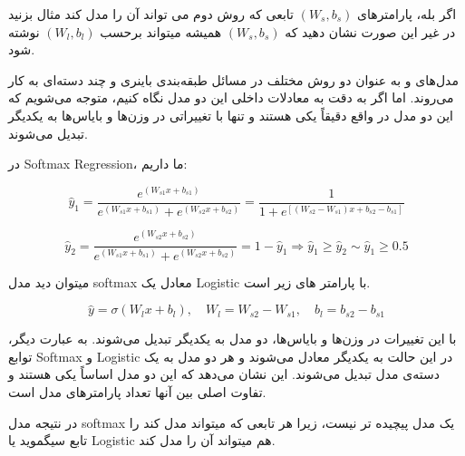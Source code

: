 \begin{enumerate}
{	      اگر بله، پارامترهای  $(W_s, b_s)$ تابعی که روش دوم می تواند آن را مدل کند مثال بزنید در غیر این صورت
	      نشان دهید که $(W_s, b_s)$ همیشه میتواند برحسب $(W_l, b_l)$ نوشته شود.

	      \begin{qsolve}[]
		      مدل‌های  و  به عنوان دو روش مختلف در مسائل طبقه‌بندی باینری و چند دسته‌ای به کار می‌روند. اما اگر به دقت به معادلات داخلی این دو مدل نگاه کنیم، متوجه می‌شویم که این دو مدل در واقع دقیقاً یکی هستند و تنها با تغییراتی در وزن‌ها و بایاس‌ها به یکدیگر تبدیل می‌شوند.

		      در Softmax Regression، ما داریم:

		      \[
			      \hat{y}_1 = \frac{e^{(W_{s1}x + b_{s1})}}{e^{(W_{s1}x + b_{s1})} + e^{(W_{s2}x + b_{s2})}}=\frac{1}{1 + e^{[(W_{s2}-W_{s1})x + b_{s2}-b_{s1}]}}
		      \]

		      \[
			      \hat{y}_2 = \frac{e^{(W_{s2}x + b_{s2})}}{e^{(W_{s1}x + b_{s1})} + e^{(W_{s2}x + b_{s2})}}=1-\hat{y}_1\Rightarrow \hat{y}_1\geq\hat{y}_2\sim\hat{y}_1\geq0.5
		      \]

		      میتوان دید مدل softmax معادل یک Logistic با پارامتر های زیر است.

		      \[
			      \hat{y} = \sigma(W_lx + b_l),\quad W_l = W_{s2}-W_{s1},\quad b_l=b_{s2}-b_{s1}
		      \]

		      با این تغییرات در وزن‌ها و بایاس‌ها، دو مدل به یکدیگر تبدیل می‌شوند. به عبارت دیگر، توابع Softmax و Logistic در این حالت به یکدیگر معادل می‌شوند و هر دو مدل به یک دسته‌ی مدل تبدیل می‌شوند. این نشان می‌دهد که این دو مدل اساساً یکی هستند و تفاوت اصلی بین آنها تعداد پارامترهای مدل است.

              در نتیجه مدل softmax یک مدل پیچیده تر نیست، زیرا هر تابعی که میتواند مدل کند را تابع سیگموید یا Logistic هم میتواند آن را مدل کند.
	      \end{qsolve}
	      }
\end{enumerate}